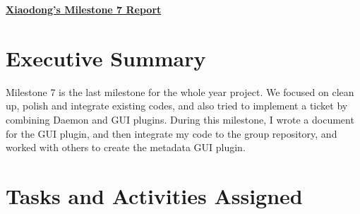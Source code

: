 \begin{center}
{\large\textbf{\underline{{Xiaodong's Milestone 7 Report}}}}
\end{center}

\section*{Executive Summary}

Milestone 7 is the last milestone for the whole year project. We focused on clean up, polish and integrate existing codes, and also tried to implement a ticket by combining Daemon and GUI plugins. During this milestone, I wrote a document for the GUI plugin, and then integrate my code to the group repository, and worked with others to create the metadata GUI plugin.

\section*{Tasks and Activities Assigned}

